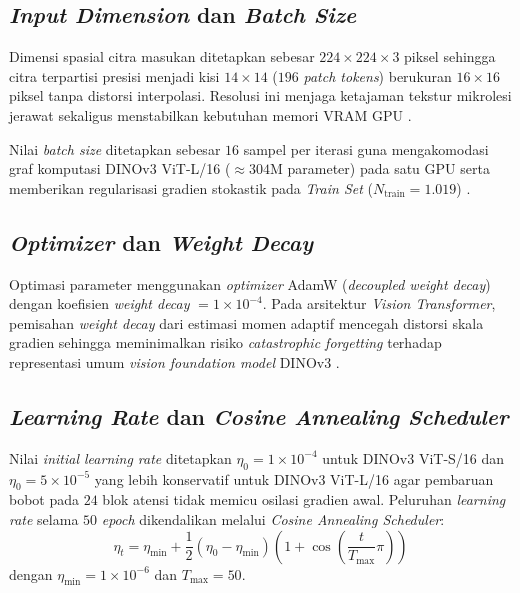 \subsection{\textit{Input Dimension} dan \textit{Batch Size}}
Dimensi spasial citra masukan ditetapkan sebesar $224 \times 224 \times 3$ piksel sehingga citra terpartisi presisi menjadi kisi $14 \times 14$ ($196$ \textit{patch tokens}) berukuran $16 \times 16$ piksel tanpa distorsi interpolasi. Resolusi ini menjaga ketajaman tekstur mikrolesi jerawat sekaligus menstabilkan kebutuhan memori VRAM GPU \cite{simeoni2025dinov3}.

Nilai \textit{batch size} ditetapkan sebesar $16$ sampel per iterasi guna mengakomodasi graf komputasi DINOv3 ViT-L/16 ($\approx 304\text{M}$ parameter) pada satu GPU serta memberikan regularisasi gradien stokastik pada \textit{Train Set} ($N_{\text{train}} = 1.019$) \cite{davila2024}.

\subsection{\textit{Optimizer} dan \textit{Weight Decay}}
Optimasi parameter menggunakan \textit{optimizer} AdamW (\textit{decoupled weight decay}) dengan koefisien \textit{weight decay} $= 1 \times 10^{-4}$. Pada arsitektur \textit{Vision Transformer}, pemisahan \textit{weight decay} dari estimasi momen adaptif mencegah distorsi skala gradien sehingga meminimalkan risiko \textit{catastrophic forgetting} terhadap representasi umum \textit{vision foundation model} DINOv3 \cite{simeoni2025dinov3}.

\subsection{\textit{Learning Rate} dan \textit{Cosine Annealing Scheduler}}
Nilai \textit{initial learning rate} ditetapkan $\eta_0 = 1 \times 10^{-4}$ untuk DINOv3 ViT-S/16 dan $\eta_0 = 5 \times 10^{-5}$ yang lebih konservatif untuk DINOv3 ViT-L/16 agar pembaruan bobot pada $24$ blok atensi tidak memicu osilasi gradien awal. Peluruhan \textit{learning rate} selama $50$ \textit{epoch} dikendalikan melalui \textit{Cosine Annealing Scheduler}:
\begin{equation}
    \eta_t = \eta_{\text{min}} + \frac{1}{2}(\eta_0 - \eta_{\text{min}})\left(1 + \cos\left(\frac{t}{T_{\text{max}}}\pi\right)\right)
\end{equation}
dengan $\eta_{\text{min}} = 1 \times 10^{-6}$ dan $T_{\text{max}} = 50$.

